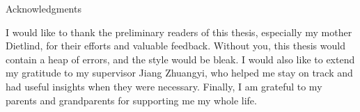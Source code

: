 \thispagestyle{empty}

\vspace*{20mm}

\begin{center}
{ Acknowledgments}
\end{center}

\vspace{10mm}

I would like to thank the preliminary readers of this thesis, especially my mother Dietlind, for their efforts and valuable feedback.
Without you, this thesis would contain a heap of errors, and the style would be bleak.
I would also like to extend my gratitude to my supervisor Jiang Zhuangyi, who helped me stay on track and had useful insights when they were necessary.
Finally, I am grateful to my parents and grandparents for supporting me my whole life.

\cleardoublepage{}
